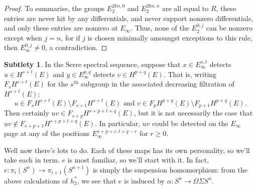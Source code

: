 \documentclass{article}
\newcommand{\Z}{\mathbb{Z}}
\renewcommand{\to}{\longrightarrow}
\theoremstyle{definition}
\newtheorem{subtlety}[thm]{Subtlety}
\begin{document}
\begin{proof}
To summarise, the groups $E_2^{2kn,0}$ and $E_2^{2kn,n}$ are all equal to $R$, these entries are never hit by any differentials, and never support nonzero differentials, and only these entries are nonzero at $E_\infty$. Thus, none of the $E_2^{0,j}$ can be nonzero except when $j=n$, for if $j$ is chosen minimally amoungst exceptions to this rule, then $E_\infty^{0,j}\neq0$, a contradiction.
%
%
%
\end{proof}
\begin{subtlety}\label{EinftyProductSubtlety}
In the Serre spectral sequence, suppose that $x\in E^{s,t}_\infty$ detects $u\in H^{s+t}(E)$ and $y\in E^{p,q}_\infty$ detects $v\in H^{p+q}(E)$. That is, writing $F_sH^{s+t}(E)$ for the $s^\text{th}$ subgroup in the associated decreasing filtration of $H^{s+t}(E)$:
\[u\in F_sH^{s+t}(E)\setminus F_{s+1}H^{s+t}(E)\text{ and }v\in F_pH^{p+q}(E)\setminus F_{p+1}H^{p+q}(E).\]
Then certainly $uv\in F_{s+p}H^{s+p+t+q}(E)$, but it is not necessarily the case that $uv\notin F_{s+p+1}H^{s+p+t+q}(E)$. In particular, $uv$ could be detected on the $E_\infty$ page at any of the positions $E_\infty^{s+p+r,t+q-r}$ for $r\geq0$.
\end{subtlety}

Well now there's lots to do.  Each of these maps has its own personality, so we'll take each in term.  $e$ is most familiar, so we'll start with it. In fact, $e:\pi_i(S^n)\to\pi_{i+1}(S^{n+1})$ is simply the suspension homomorphism: from the above calculations of $h_2^*$, we see that $e$ is induced by $\alpha:S^n\to \Omega\Sigma S^n$.
\end{document}
